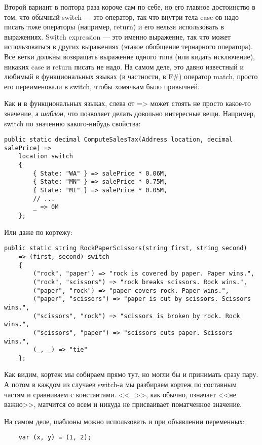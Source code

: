 \documentclass{../../text-style}
\begin{document}
Второй вариант в полтора раза короче сам по себе, но его главное достоинство в том, что обычный switch --- это оператор, так что внутри тела case-ов надо писать тоже операторы (например, return) и его нельзя использовать в выражениях. Switch expression --- это именно выражение, так что может использоваться в других выражениях (этакое обобщение тернарного оператора). Все ветки должны возвращать выражение одного типа (или кидать исключение), никаких case и return писать не надо. На самом деле, это давно известный и любимый в функциональных языках (в частности, в F\#) оператор match, просто его переименовали в switch, чтобы хомячкам было привычней.

Как и в функциональных языках, слева от => может стоять не просто какое-то значение, а \textit{шаблон}, что позволяет делать довольно интересные вещи. Например, switch по значению какого-нибудь свойства:

\begin{verbatim}
public static decimal ComputeSalesTax(Address location, decimal salePrice) =>
    location switch
    {
        { State: "WA" } => salePrice * 0.06M,
        { State: "MN" } => salePrice * 0.75M,
        { State: "MI" } => salePrice * 0.05M,
        // ...
        _ => 0M
    };
\end{verbatim}

Или даже по кортежу:

\begin{verbatim}
public static string RockPaperScissors(string first, string second)
    => (first, second) switch
    {
        ("rock", "paper") => "rock is covered by paper. Paper wins.",
        ("rock", "scissors") => "rock breaks scissors. Rock wins.",
        ("paper", "rock") => "paper covers rock. Paper wins.",
        ("paper", "scissors") => "paper is cut by scissors. Scissors wins.",
        ("scissors", "rock") => "scissors is broken by rock. Rock wins.",
        ("scissors", "paper") => "scissors cuts paper. Scissors wins.",
        (_, _) => "tie"
    };
\end{verbatim}

Как видим, кортеж мы собираем прямо тут, но могли бы и принимать сразу пару. А потом в каждом из случаев switch-а мы разбираем кортеж по составным частям и сравниваем с константами. <<\_>>, как обычно, означает <<не важно>>, матчится со всем и никуда не присваивает поматченное значение.

На самом деле, шаблоны можно использовать и при объявлении переменных:

\begin{verbatim}
    var (x, y) = (1, 2);
\end{verbatim}
\end{document}
